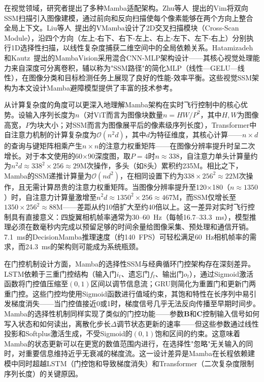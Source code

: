 \documentclass[12pt,a4paper]{article}
\numberwithin{equation}{section}
\numberwithin{figure}{section}
\numberwithin{table}{section}
\begin{document}
在视觉领域，研究者提出了多种Mamba适配架构。Zhu等人~\cite{zhu2024vim}提出的Vim将双向SSM扫描引入图像建模，通过前向和反向扫描使每个像素能够在两个方向上整合全局上下文。Liu等人~\cite{liu2024vmamba}提出的VMamba设计了2D交叉扫描模块（Cross-Scan Module），沿四个方向（左上-右下、右下-左上、右上-左下、左下-右上）分别执行1D选择性扫描，以线性复杂度捕获二维空间中的全局依赖关系。Hatamizadeh和Kautz~\cite{hatamizadeh2024mambavision}提出的MambaVision采用混合CNN-MLP架构设计——其核心视觉处理能力来自深度可分离卷积，辅以称为"SSM路径"的简化MLP（线性—GELU—线性），在图像分类和目标检测任务上展现了良好的性能-效率平衡。这些视觉SSM架构为本文设计Mamba避障模型提供了丰富的技术参考。

从计算复杂度的角度可以更深入地理解Mamba架构在实时飞行控制中的核心优势。设输入序列长度为$n$（对ViT而言为图像块数量$n = HW/P^2$，其中$H,W$为图像高宽，$P$为块大小；对SSM而言为图像展平后的像素级序列长度），Transformer中自注意力机制的计算复杂度为$\mathcal{O}(n^2 d)$，其中$d$为特征维度，其核心计算——$n \times d$的查询与键矩阵相乘产生$n \times n$的注意力权重矩阵——在图像分辨率提升时呈二次增长。对于本文使用的60$\times$90深度图，取$P=4$时$n \approx 338$，自注意力单头计算量约为$n^2 d \approx 338^2 \times 256 \approx 29$M次操作，多头（如8头）累积约235M。相比之下，Mamba的SSM递推计算量为$\mathcal{O}(n d^2)$，在相同设置下约为$338 \times 256^2 \approx 22$M次操作，且无需计算昂贵的注意力权重矩阵。当图像分辨率提升至120$\times$180（$n \approx 1350$）时，自注意力计算量激增至$n^2 d \approx 1350^2 \times 256 \approx 467$M，而SSM仅增长至$1350 \times 256^2 \approx 88$M——差距从约10倍扩大至约40倍以上。这一差异对实时飞行控制具有直接意义：四旋翼相机帧率通常为30--60~Hz（每帧16.7--33.3~ms），模型推理必须在数毫秒内完成以预留足够的时间余量给图像采集、预处理和通信开销。7.1~ms的DecisionMamba推理速度（约140~FPS）可轻松满足60~Hz相机帧率的需求，而24.3~ms的架构则可能成为系统瓶颈。

在门控机制设计方面，Mamba的选择性SSM与经典循环门控架构存在深刻差异。LSTM依赖于三重门控结构（输入门$i_t$、遗忘门$f_t$、输出门$o_t$），通过Sigmoid激活函数将门控值压缩至$(0,1)$区间以调节信息流；GRU则简化为重置门和更新门两重门控。这些门控均使用Sigmoid函数进行值域约束，其饱和特性在长序列中易引发梯度消失——当门控值接近0或1时，梯度信号几乎无法反向传播至早期时间步。Mamba的选择性机制同样实现了类似的门控功能——参数$\mathbf{B}$和$\mathbf{C}$控制输入信号如何写入状态和如何读出，离散化步长$\Delta$调节状态更新的速率——但这些参数通过线性投影和Softplus激活生成，不受Sigmoid的$(0,1)$饱和区间的约束。这意味着Mamba的状态更新可以在更宽的数值范围内进行，在选择性"忽略"无关输入的同时，对重要信息维持近乎无衰减的梯度流。这一设计差异是Mamba在长程依赖建模中同时超越LSTM（门控饱和导致梯度消失）和Transformer（二次复杂度限制序列长度）的关键原因。
\end{document}
